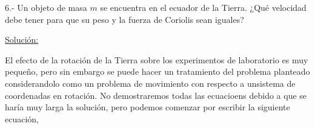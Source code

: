\documentclass[a4paper,10pt]{article}
\numberwithin{equation}{section}
\begin{document}
% 
% 
% 
% 







6.- Un objeto de masa $m$ se encuentra en el ecuador de la Tierra. ¿Qué velocidad debe 
tener para que su peso y la fuerza de Coriolis sean iguales?

\vspace{.3cm}

\underline{Solución:}

\vspace{.3cm}

El efecto de la rotación de la Tierra sobre los experimentos de laboratorio es muy pequeño, pero sin embargo se puede
hacer un tratamiento del problema planteado considerandolo como un problema de movimiento con respecto
a unsistema de coordenadas en rotación. No demostraremos todas las ecuacioens debido a que se haría
muy larga la solución, pero podemos comenzar por escribir la siguiente ecuación,
\end{document}
